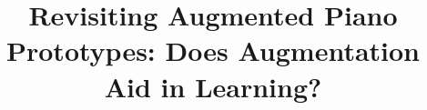\documentclass[sigconf, screen, review]{acmart}
\begin{document}
\title{Revisiting Augmented Piano Prototypes: Does Augmentation Aid in Learning? }




\end{document}
